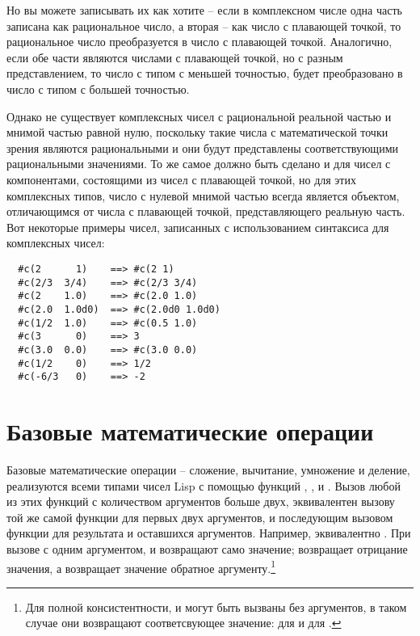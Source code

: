 Но вы можете записывать их как хотите -- если в комплексном числе одна часть записана как
рациональное число, а вторая -- как число с плавающей точкой, то рациональное число
преобразуется в число с плавающей точкой.  Аналогично, если обе части являются числами с
плавающей точкой, но с разным представлением, то число с типом с меньшей точностью, будет
преобразовано в число с типом с большей точностью.

Однако не существует комплексных чисел с рациональной реальной частью и мнимой частью
равной нулю, поскольку такие числа с математической точки зрения являются рациональными и
они будут представлены соответствующими рациональными значениями. То же самое должно быть
сделано и для чисел с компонентами, состоящими из чисел с плавающей точкой, но для этих
комплексных типов, число с нулевой мнимой частью всегда является объектом, отличающимся от
числа с плавающей точкой, представляющего реальную часть.  Вот некоторые примеры чисел,
записанных с использованием синтаксиса для комплексных чисел:

\begin{verbatim}
  #c(2      1)    ==> #c(2 1)
  #c(2/3  3/4)    ==> #c(2/3 3/4)
  #c(2    1.0)    ==> #c(2.0 1.0)
  #c(2.0  1.0d0)  ==> #c(2.0d0 1.0d0)
  #c(1/2  1.0)    ==> #c(0.5 1.0)
  #c(3      0)    ==> 3
  #c(3.0  0.0)    ==> #c(3.0 0.0)
  #c(1/2    0)    ==> 1/2
  #c(-6/3   0)    ==> -2
\end{verbatim}

\section{Базовые математические операции}

Базовые математические операции -- сложение, вычитание, умножение и деление, реализуются
всеми типами чисел Lisp с помощью функций \code{+}, \code{-}, \code{*} и \code{/}.  Вызов
любой из этих функций с количеством аргументов больше двух, эквивалентен вызову той же
самой функции для первых двух аргументов, и последующим вызовом функции для результата и
оставшихся аргументов.  Например,  эквивалентно .  При
вызове с одним аргументом, \code{+} и \code{*} возвращают само значение; \code{-}
возвращает отрицание значения, а \code{/} возвращает значение обратное
аргументу.\footnote{Для полной консистентности, \code{+} и \code{*} могут быть вызваны без
  аргументов, в таком случае они возвращают соответсвующее значение:  для \code{+}
  и  для \code{*}.}

